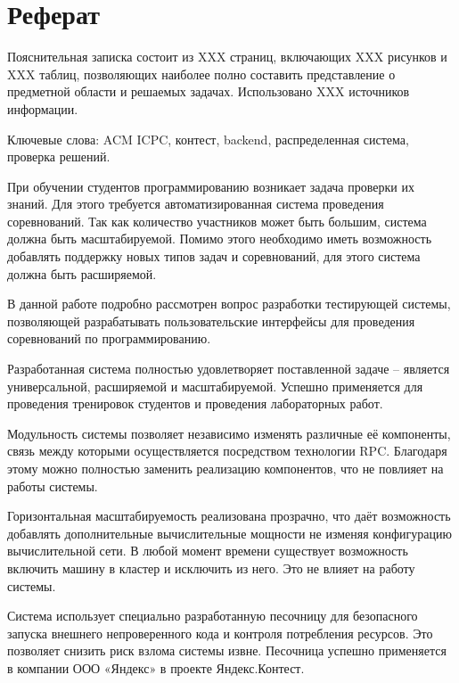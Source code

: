 \chapter*{Реферат}
Пояснительная записка состоит из XXX страниц, включающих XXX рисунков и XXX таблиц,
позволяющих наиболее полно составить представление о предметной области и решаемых задачах.
Использовано XXX источников информации.

Ключевые слова: ACM ICPC, контест, backend, распределенная система, проверка решений.

При обучении студентов программированию возникает задача
проверки их знаний. Для этого требуется автоматизированная система
проведения соревнований. Так как количество участников
может быть большим, система должна быть масштабируемой.
Помимо этого необходимо иметь возможность добавлять поддержку
новых типов задач и соревнований, для этого
система должна быть расширяемой.


В данной работе подробно рассмотрен вопрос разработки тестирующей системы,
позволяющей разрабатывать пользовательские интерфейсы
для проведения соревнований по программированию.

Разработанная система полностью удовлетворяет поставленной задаче --
является универсальной, расширяемой и масштабируемой.
Успешно применяется для проведения тренировок студентов
и проведения лабораторных работ.

Модульность системы позволяет независимо изменять различные её компоненты,
связь между которыми осуществляется посредством технологии RPC.
Благодаря этому можно полностью заменить реализацию компонентов,
что не повлияет на работы системы.

Горизонтальная масштабируемость реализована прозрачно,
что даёт возможность добавлять дополнительные
вычислительные мощности не изменяя конфигурацию вычислительной сети.
В любой момент времени существует возможность включить машину в кластер
и исключить из него. Это не влияет на работу системы.

Система использует специально разработанную песочницу для
безопасного запуска внешнего непроверенного кода и контроля потребления ресурсов.
Это позволяет снизить риск взлома системы извне.
Песочница успешно применяется в компании ООО «Яндекс» в проекте Яндекс.Контест.
